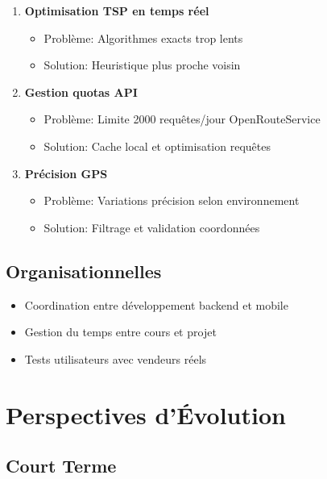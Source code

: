 \documentclass[12pt,a4paper]{report}
\begin{document}
\begin{enumerate}
    \item \textbf{Optimisation TSP en temps réel}
    \begin{itemize}
        \item Problème: Algorithmes exacts trop lents
        \item Solution: Heuristique plus proche voisin
    \end{itemize}

    \item \textbf{Gestion quotas API}
    \begin{itemize}
        \item Problème: Limite 2000 requêtes/jour OpenRouteService
        \item Solution: Cache local et optimisation requêtes
    \end{itemize}

    \item \textbf{Précision GPS}
    \begin{itemize}
        \item Problème: Variations précision selon environnement
        \item Solution: Filtrage et validation coordonnées
    \end{itemize}
\end{enumerate}

\subsection{Organisationnelles}

\begin{itemize}
    \item Coordination entre développement backend et mobile
    \item Gestion du temps entre cours et projet
    \item Tests utilisateurs avec vendeurs réels
\end{itemize}

\section{Perspectives d'Évolution}

\subsection{Court Terme}
\end{document}

